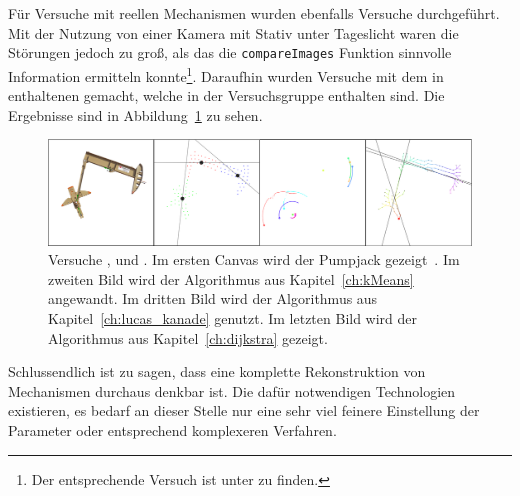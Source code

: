 Für Versuche mit reellen Mechanismen wurden ebenfalls Versuche durchgeführt.
Mit der Nutzung von einer Kamera mit Stativ unter Tageslicht waren die Störungen jedoch zu gro{\ss}, als das die \lstinline{compareImages} Funktion sinnvolle Information ermitteln konnte\footnote{Der entsprechende Versuch ist unter  zu finden.}.
Daraufhin wurden Versuche mit dem in ~\cite{Uhlig2019} enthaltenen  gemacht, welche in der Versuchsgruppe  enthalten sind.
Die Ergebnisse sind in Abbildung~\ref{fig:bilder2} zu sehen.

\begin{figure}
    \centering
    \includegraphics[width=\textwidth]{gfx/bilder2_edited.png}
    \caption[Versuche ,  und ]{Versuche ,  und . Im ersten Canvas wird der Pumpjack gezeigt~\cite{Uhlig2021}. Im zweiten Bild wird der  Algorithmus aus Kapitel~\ref{ch:kMeans} angewandt. Im dritten Bild wird der  Algorithmus aus Kapitel~\ref{ch:lucas_kanade} genutzt. Im letzten Bild wird der  Algorithmus aus Kapitel~\ref{ch:dijkstra} gezeigt.}
    \label{fig:bilder2}
\end{figure}

Schlussendlich ist zu sagen, dass eine komplette Rekonstruktion von Mechanismen durchaus denkbar ist.
Die dafür notwendigen Technologien existieren, es bedarf an dieser Stelle nur eine sehr viel feinere Einstellung der Parameter oder entsprechend komplexeren Verfahren.
